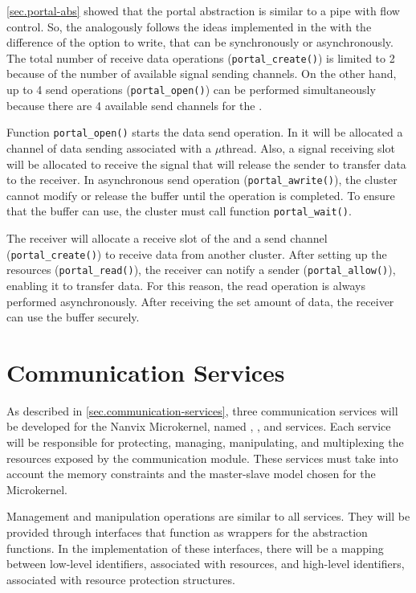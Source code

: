 		\autoref{sec.portal-abs} showed that the portal abstraction is similar to
		a \posix pipe with flow control.
		So, the \portal analogously follows the ideas implemented
		in the \mailbox with the difference of the option to write,
		that can be synchronously or asynchronously.
		The total number of receive data operations (\texttt{portal\_create()})
		is limited to 2 because of the number of available signal sending channels.
		On the other hand, up to 4 send operations (\texttt{portal\_open()})
		can be performed simultaneously because there are 4 available send
		channels for the \portal.

		Function \texttt{portal\_open()} starts the data send operation.
		In it will be allocated a channel of data sending associated with
		a $\mu$thread.
		Also, a signal receiving slot will be allocated to receive the
		signal that will release the sender to transfer data to the receiver.
		In asynchronous send operation (\texttt{portal\_awrite()}), the cluster
		cannot modify or release the buffer until the operation is completed.
		To ensure that the buffer can use, the cluster must call function \texttt{portal\_wait()}.

		The receiver will allocate a receive slot of the \dnoc and a send
		channel (\texttt{portal\_create()}) to receive data from another cluster.
		After setting up the resources (\texttt{portal\_read()}), the receiver
		can notify a sender (\texttt{portal\_allow()}), enabling it to transfer data.
		For this reason, the read operation is always performed asynchronously.
		After receiving the set amount of data, the receiver can use the buffer securely.

	\section{Communication Services}

		As described in \autoref{sec.communication-services}, three communication
		services will be developed for the Nanvix Microkernel, named \sync, \mailbox,
		and \portal services.
		Each service will be responsible for protecting, managing, manipulating,
		and multiplexing the resources exposed by the \hal communication module.
		These services must take into account the memory constraints and the
		master-slave model chosen for the Microkernel.

		Management and manipulation operations are similar to all services.
		They will be provided through interfaces that function as wrappers
		for the \hal abstraction functions.
		In the implementation of these interfaces, there will be a mapping
		between low-level identifiers, associated with \hal resources,
		and high-level identifiers, associated with resource protection structures.

